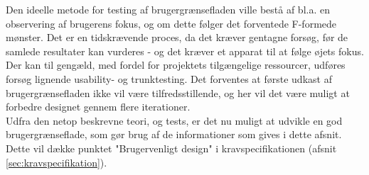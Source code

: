 
Den ideelle metode for testing af brugergrænsefladen ville bestå af bl.a. en observering af brugerens fokus, og om dette følger det forventede F-formede mønster. Det er en tidskrævende proces, da det kræver gentagne forsøg, før de samlede resultater kan vurderes - og det kræver et apparat til at følge øjets fokus. Der kan til gengæld, med fordel for projektets tilgængelige ressourcer, udføres forsøg lignende usability- og trunktesting. Det forventes at første udkast af brugergrænsefladen ikke vil være tilfredsstillende, og her vil det være muligt at forbedre designet gennem flere iterationer.\\

Udfra den netop beskrevne teori, og tests, er det nu muligt at udvikle en god brugergrænseflade, som gør brug af de informationer som gives i dette afsnit. Dette vil dække punktet "Brugervenligt design" i kravspecifikationen (afsnit \ref{sec:kravspecifikation}).





